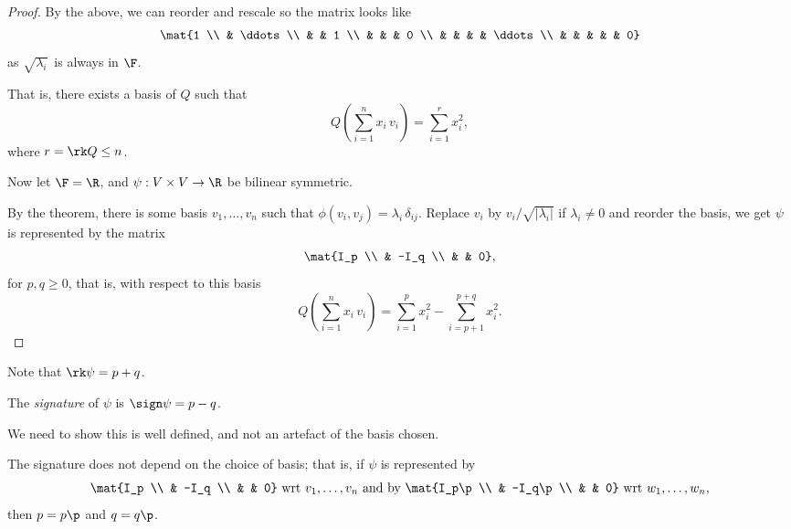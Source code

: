 \begin{proof}
	By the above, we can reorder and rescale so the matrix looks like %
	\begin{equation*}
		\mat{1 \\ & \ddots \\ & & 1 \\ & & & 0 \\ & & & & \ddots \\ & & & & & 0}
	\end{equation*}
	as $\sqrt{\lambda_i}$\, is always in $\F$.
	
		\pagebreak
	
	That is, there exists a basis of $Q$ such that
	\begin{equation*}
		Q\left( \sum_{i=1}^n x_i\,v_i \right) = \sum_{i=1}^r x_i^2,
	\end{equation*}
	where $r=\rk Q\leq n$.

	Now let $\F=\R$, and $\psi:V\times V\to\R$ be bilinear symmetric. %
	
	By the theorem, there is some basis $v_1,\ldots,v_n$ such that $\phi(v_i,v_j)=\lambda_i\,\delta_{ij}$. Replace $v_i$ by $v_i/\sqrt{\left\vert \lambda_i \right\vert}$ if $\lambda_i\neq 0$ and reorder the basis, we get $\psi$ is represented by the matrix %
	\begin{equation*}
		\mat{I_p \\ & -I_q \\ & & 0},
	\end{equation*}
	for $p,q\geq 0$, that is, with respect to this basis
	\begin{equation*}
		Q\left( \sum_{i=1}^n x_i\,v_i \right) = \sum_{i=1}^p x_i^2 - \sum_{i=p+1}^{p+q} x_i^2.
	\end{equation*}
\end{proof}

Note that $\rk\psi = p+q$.

\begin{definition}
	The \emph{signature} of $\psi$ is $\sign \psi=p-q$. 
\end{definition}

We need to show this is well defined, and not an artefact of the basis chosen.

\begin{theorem}
	 The signature does not depend on the choice of basis; that is, if $\psi$ is represented by %
	\begin{equation*}
		\mat{I_p \\ & -I_q \\ & & 0} \text{ wrt } v_1,\ldots,v_n \text{ and by }
		\mat{I_p\p \\ & -I_q\p \\ & & 0} \text{ wrt } w_1,\ldots,w_n,
	\end{equation*}
	then $p=p\p$ and $q=q\p$.
\end{theorem}

